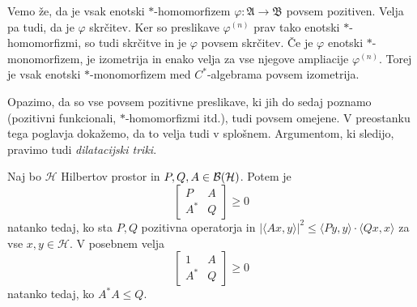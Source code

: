 \begin{zgled}
    Vemo že, da je vsak enotski $*$-homomorfizem $\varphi: \mathfrak{A} \to \mathfrak{B}$ povsem pozitiven.
    Velja pa tudi, da je $\varphi$ skrčitev. Ker so preslikave $\varphi^{(n)}$ prav tako enotski $*$-homomorfizmi,
    so tudi skrčitve in je $\varphi$ povsem skrčitev. Če je $\varphi$ enotski $*$-monomorfizem, je izometrija in enako velja za vse njegove ampliacije $\varphi^{(n)}$.
    Torej je vsak enotski $*$-monomorfizem med $C^*$-algebrama povsem izometrija.
\end{zgled}

Opazimo, da so vse povsem pozitivne preslikave, ki jih do sedaj poznamo (pozitivni funkcionali, $*$-homomorfizmi itd.), tudi povsem omejene.
V preostanku tega poglavja dokažemo, da to velja tudi v splošnem. Argumentom, ki sledijo, pravimo tudi \emph{dilatacijski triki}.

\begin{lema}\label{lem:random1}
    Naj bo $\mathcal{H}$ Hilbertov prostor in $P, Q, A \in \operatorname{\mathcal{B} (\mathcal{H})}$.
    Potem je $$\begin{bmatrix}
            P & A\\
             A^* & Q
        \end{bmatrix} \geq 0$$
        natanko tedaj, ko sta $P, Q$ pozitivna operatorja in 
        $|\langle Ax, y\rangle|^2 \leq \langle Py, y\rangle \cdot \langle Qx, x \rangle$
        za vse $x, y \in \mathcal{H}$.
        V posebnem velja
        $$\begin{bmatrix}
            1 & A\\
             A^* & Q
        \end{bmatrix} \geq 0$$
        natanko tedaj, ko $A^* A \leq Q$.
\end{lema}

